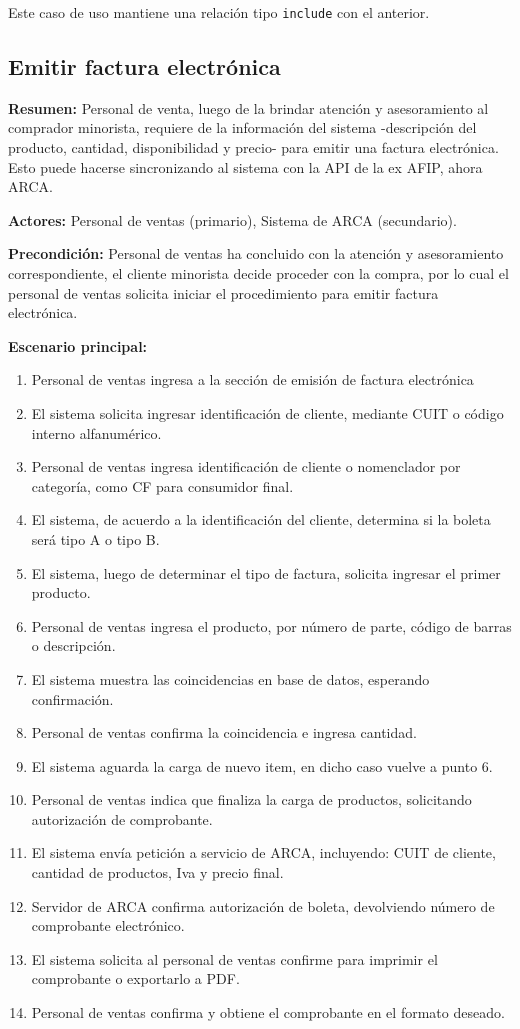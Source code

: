 Este caso de uso mantiene una relación tipo \texttt{include} con el anterior.

\pagebreak

\subsection{Emitir factura electrónica}

\textbf{Resumen:}
Personal de venta, 
luego de la brindar atención y asesoramiento al comprador minorista,
requiere de la información del sistema
-descripción del producto, cantidad, disponibilidad y precio-
para emitir una factura electrónica.
Esto puede hacerse sincronizando al sistema con la API de la ex AFIP,
ahora ARCA.

\textbf{Actores:} Personal de ventas (primario), Sistema de ARCA (secundario).

\textbf{Precondición:} 
Personal de ventas ha concluido con la atención y asesoramiento correspondiente,
el cliente minorista decide proceder con la compra,
por lo cual el personal de ventas solicita iniciar el procedimiento para emitir factura electrónica.

\textbf{Escenario principal:}
\begin{enumerate}
	\item Personal de ventas ingresa a la sección de emisión de factura electrónica
	\item El sistema solicita ingresar identificación de cliente, mediante CUIT o código interno alfanumérico.
	\item Personal de ventas ingresa identificación de cliente o nomenclador por categoría, como CF para consumidor final.
	\item El sistema, de acuerdo a la identificación del cliente, determina si la boleta será tipo A o tipo B.
	\item El sistema, luego de determinar el tipo de factura, solicita ingresar el primer producto.
	\item Personal de ventas ingresa el producto, por número de parte, código de barras o descripción.
	\item El sistema muestra las coincidencias en base de datos, esperando confirmación.
	\item Personal de ventas confirma la coincidencia e ingresa cantidad.
	\item El sistema aguarda la carga de nuevo item, en dicho caso vuelve a punto 6.
	\item Personal de ventas indica que finaliza la carga de productos, solicitando autorización de comprobante.
	\item El sistema envía petición a servicio de ARCA, incluyendo: CUIT de cliente, cantidad de productos, Iva y precio final.
	\item Servidor de ARCA confirma autorización de boleta, devolviendo número de comprobante electrónico.
	\item El sistema solicita al personal de ventas confirme para imprimir el comprobante o exportarlo a PDF.
	\item Personal de ventas confirma y obtiene el comprobante en el formato deseado.
\end{enumerate}


